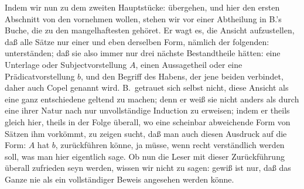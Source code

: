 Indem wir nun zu dem zweiten Hauptstücke:  übergehen, und hier den ersten Abschnitt von den  vornehmen wollen, stehen wir vor einer Abtheilung in B.'s Buche, die zu den mangelhaftesten gehöret. Er wagt es,  die Ansicht aufzustellen, daß alle Sätze nur einer und eben derselben Form, nämlich der folgenden:  unterständen; daß sie also immer nur drei nächste Bestandtheile hätten: eine Unterlage oder Subjectvorstellung $A$, einen Aussagetheil oder eine Prädicatvorstellung $b$, und den Begriff des Habens, der jene beiden verbindet, daher auch Copel genannt wird. B.\ getrauet sich selbst nicht, diese Ansicht als eine ganz entschiedene geltend zu machen; denn er weiß sie nicht anders als durch eine ihrer Natur nach nur unvollständige Induction zu erweisen; indem er theils gleich hier, theils in der Folge überall, wo eine scheinbar abweichende Form von Sätzen ihm vorkömmt, zu zeigen sucht, daß man auch diesen Ausdruck auf die Form: $A$ hat $b$, zurückführen könne, ja müsse, wenn recht verständlich werden soll, was man hier eigentlich sage. Ob nun die Leser mit dieser Zurückführung überall zufrieden seyn werden, wissen wir nicht zu sagen: gewiß ist nur, daß das Ganze nie als ein vollständiger Beweis angesehen werden könne. \par
